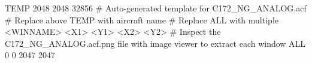 TEMP 2048 2048 32856
# Auto-generated template for C172_NG_ANALOG.acf
# Replace above TEMP with aircraft name
# Replace ALL with multiple <WINNAME> <X1> <Y1> <X2> <Y2>
# Inspect the C172_NG_ANALOG.acf.png file with image viewer to extract each window
ALL 0 0 2047 2047
